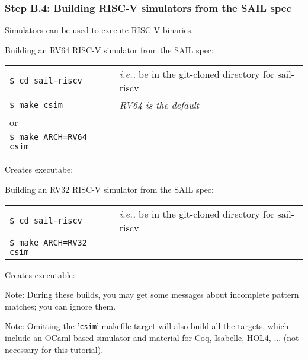 \documentclass[aspectratio=169]{beamer}
\newcommand{\hm}{\hspace*{1em}}
\newcommand{\hmmm}{\hspace*{3em}}
\begin{document}
\begin{frame}
  \frametitle{Step B.4: Building RISC-V simulators from the SAIL spec}

  {\small Simulators can be used to execute RISC-V binaries.}

  \begin{block}{Building an RV64 RISC-V simulator from the SAIL spec:}
    \scriptsize
    \begin{tabular}{ll}
      \tt \$ cd sail-riscv \hmmm & \emph{i.e.,} be in the git-cloned directory for sail-riscv \\
      \tt \$ make  csim          & \emph{RV64 is the default} \\
      or \\
      \tt \$ make  ARCH=RV64  csim
    \end{tabular}

    \vspace*{1ex}

    Creates executabe: \hm {\tt c\_emulator/riscv\_sim\_RV64}
  \end{block}

  \begin{block}{Building an RV32 RISC-V simulator from the SAIL spec:}
    \scriptsize
    \begin{tabular}{ll}
      \tt \$ cd sail-riscv \hmmm & \emph{i.e.,} be in the git-cloned directory for sail-riscv \\
      \tt \$ make  ARCH=RV32  csim
    \end{tabular}

    \vspace*{1ex}

    Creates executable: \hm {\tt c\_emulator/riscv\_sim\_RV32}
  \end{block}

  {\tiny Note: During these builds, you may get some messages about
    incomplete pattern matches; you can ignore them.}

  {\tiny Note: Omitting the '{\tt csim}' makefile target will also
    build all the targets, which include an OCaml-based simulator and
    material for Coq, Isabelle, HOL4, ... (not necessary for this
    tutorial).}

\end{frame}

\end{document}
